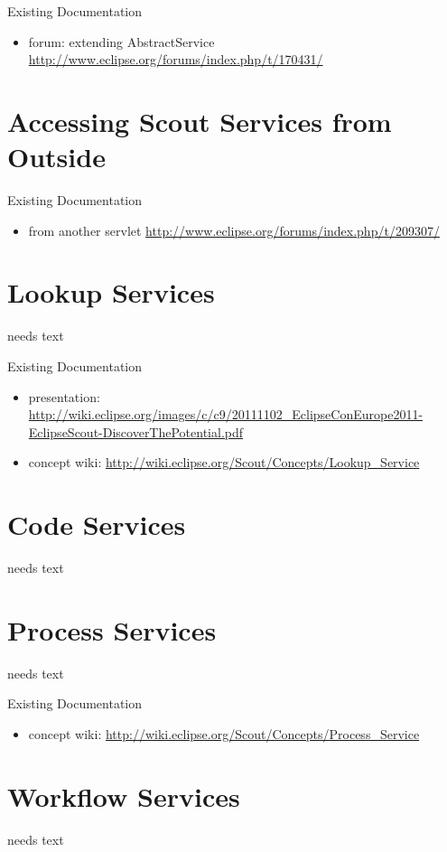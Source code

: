 \documentclass[a4paper,10pt,twoside]{book}
\begin{document}
\noindent Existing Documentation
\begin{itemize}
  \item forum: extending AbstractService \url{http://www.eclipse.org/forums/index.php/t/170431/}
\end{itemize}

\section{Accessing Scout Services from Outside}

\noindent Existing Documentation
\begin{itemize}
  \item from another servlet \url{http://www.eclipse.org/forums/index.php/t/209307/}
\end{itemize}

\section{Lookup Services}
needs text

\noindent Existing Documentation
\begin{itemize}
  \item presentation: \url{http://wiki.eclipse.org/images/c/c9/20111102_EclipseConEurope2011-EclipseScout-DiscoverThePotential.pdf}
  \item concept wiki: \url{http://wiki.eclipse.org/Scout/Concepts/Lookup_Service}
\end{itemize}

\section{Code Services}
needs text

\section{Process Services}
needs text

\noindent Existing Documentation
\begin{itemize}
  \item concept wiki: \url{http://wiki.eclipse.org/Scout/Concepts/Process_Service}
\end{itemize}

\section{Workflow Services}
needs text
\end{document}
